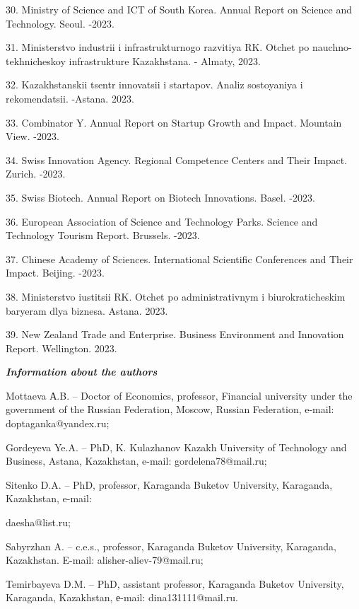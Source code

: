 \begin{noparindent}
30. Ministry of Science and ICT of South Korea. Annual Report on Science
and Technology. Seoul. -2023.

31. Ministerstvo industrii i infrastrukturnogo razvitiya RK. Otchet po
nauchno-tekhnicheskoy infrastrukture Kazakhstana. - Almaty, 2023.

32. Kazakhstanskii tsentr innovatsii i startapov. Analiz sostoyaniya i
rekomendatsii. -Astana. 2023.

33. Combinator Y. Annual Report on Startup Growth and Impact. Mountain
View. -2023.

34. Swiss Innovation Agency. Regional Competence Centers and Their
Impact. Zurich. -2023.

35. Swiss Biotech. Annual Report on Biotech Innovations. Basel. -2023.

36. European Association of Science and Technology Parks. Science and
Technology Tourism Report. Brussels. -2023.

37. Chinese Academy of Sciences. International Scientific Conferences
and Their Impact. Beijing. -2023.

38. Ministerstvo iustitsii RK. Otchet po administrativnym i
biurokraticheskim bar\textquotesingle yeram dlya biznesa. Astana. 2023.

39. New Zealand Trade and Enterprise. Business Environment and
Innovation Report. Wellington. 2023.
\end{noparindent}

\emph{{\bfseries Information about the authors}}

\begin{noparindent}
Mottaeva А.B. -- Doctor of Economics, professor, Financial university
under the government of the Russian Federation, Moscow, Russian
Federation, e-mail: doptaganka@yandex.ru;

Gordeyeva Ye.A. -- PhD, K. Kulazhanov Kazakh University of Technology
and Business, Astana, Kazakhstan, e-mail: gordelena78@mail.ru;

Sitenko D.A. -- PhD, professor, Karaganda Buketov University, Karaganda,
Kazakhstan, e-mail:

daesha@list.ru;

Sabyrzhan A. -- c.e.s., professor, Karaganda Buketov University,
Karaganda, Kazakhstan. E-mail: alisher-aliev-79@mail.ru;

Temirbayeva D.M. -- PhD, assistant professor, Karaganda Buketov
University, Karaganda, Kazakhstan, е-mail: dina131111@mail.ru.
\end{noparindent}

